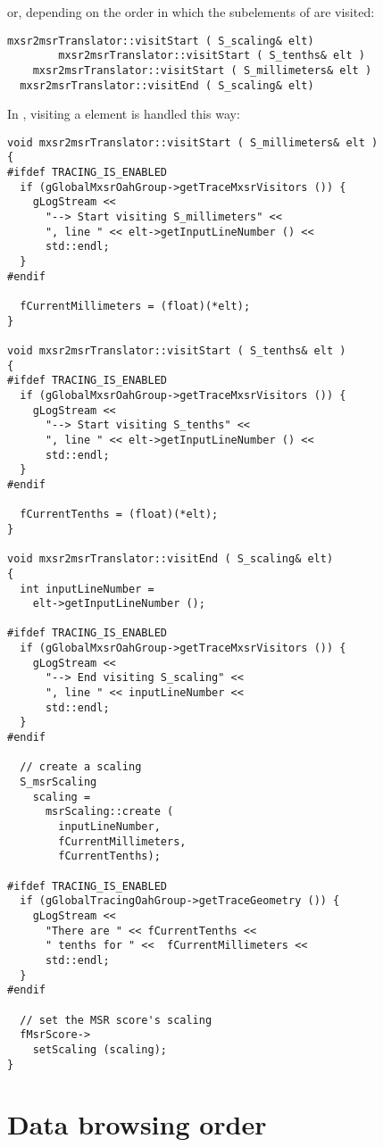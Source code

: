 or, depending on the order in which the subelements of  are visited:
\begin{lstlisting}[language=CPlusPlus]
  mxsr2msrTranslator::visitStart ( S_scaling& elt)
		mxsr2msrTranslator::visitStart ( S_tenths& elt )
  	mxsr2msrTranslator::visitStart ( S_millimeters& elt )
  mxsr2msrTranslator::visitEnd ( S_scaling& elt)
\end{lstlisting}

In , visiting a  element is handled this way:
\begin{lstlisting}[language=CPlusPlus,caption={Visiting {\tt $<$scaling /$>$}}]
void mxsr2msrTranslator::visitStart ( S_millimeters& elt )
{
#ifdef TRACING_IS_ENABLED
  if (gGlobalMxsrOahGroup->getTraceMxsrVisitors ()) {
    gLogStream <<
      "--> Start visiting S_millimeters" <<
      ", line " << elt->getInputLineNumber () <<
      std::endl;
  }
#endif

  fCurrentMillimeters = (float)(*elt);
}

void mxsr2msrTranslator::visitStart ( S_tenths& elt )
{
#ifdef TRACING_IS_ENABLED
  if (gGlobalMxsrOahGroup->getTraceMxsrVisitors ()) {
    gLogStream <<
      "--> Start visiting S_tenths" <<
      ", line " << elt->getInputLineNumber () <<
      std::endl;
  }
#endif

  fCurrentTenths = (float)(*elt);
}

void mxsr2msrTranslator::visitEnd ( S_scaling& elt)
{
  int inputLineNumber =
    elt->getInputLineNumber ();

#ifdef TRACING_IS_ENABLED
  if (gGlobalMxsrOahGroup->getTraceMxsrVisitors ()) {
    gLogStream <<
      "--> End visiting S_scaling" <<
      ", line " << inputLineNumber <<
      std::endl;
  }
#endif

  // create a scaling
  S_msrScaling
    scaling =
      msrScaling::create (
        inputLineNumber,
        fCurrentMillimeters,
        fCurrentTenths);

#ifdef TRACING_IS_ENABLED
  if (gGlobalTracingOahGroup->getTraceGeometry ()) {
    gLogStream <<
      "There are " << fCurrentTenths <<
      " tenths for " <<  fCurrentMillimeters <<
      std::endl;
  }
#endif

  // set the MSR score's scaling
  fMsrScore->
    setScaling (scaling);
}
\end{lstlisting}


\section{Data browsing order}

